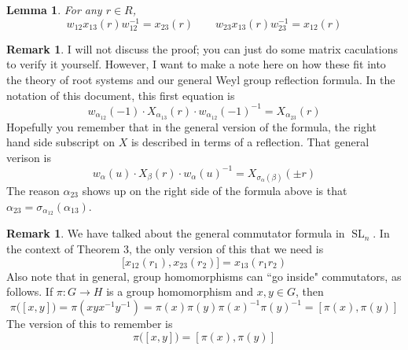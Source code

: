 \documentclass[12pt]{article}
\newtheorem{lemma}[theorem]{Lemma}
\theoremstyle{definition}
\newtheorem{remark}[theorem]{Remark}
\numberwithin{theorem}{subsection}
\newcommand{\sig}{\sigma}
\newcommand{\inv}{^{-1}}
\DeclareMathOperator{\SL}{SL}
\begin{document}
\begin{lemma}
For any $r \in R$, 
\[
	w_{12} x_{13}(r) w_{12} \inv = x_{23}(r) \qquad w_{23} x_{13}(r) w_{23} \inv = x_{12}(r)
\]
\end{lemma}

\begin{remark}
I will not discuss the proof; you can just do some matrix caculations to verify it yourself. However, I want to make a note here on how these fit into the theory of root systems and our general Weyl group reflection formula. In the notation of this document, this first equation is
\[
	w_{\alpha_{12}}(-1) \cdot X_{\alpha_{13}}(r) \cdot w_{\alpha_{12}}(-1) \inv = X_{\alpha_{23}}(r)
\]
Hopefully you remember that in the general version of the formula, the right hand side subscript on $X$ is described in terms of a reflection. That general verison is
\[
	w_\alpha(u) \cdot X_{\beta}(r) \cdot w_\alpha(u) \inv = X_{\sig_\alpha(\beta)} ( \pm r)
\]
The reason $\alpha_{23}$ shows up on the right side of the formula above is that $\alpha_{23} = \sig_{\alpha_{12}} (\alpha_{13})$.
\end{remark}

\begin{remark}
We have talked about the general commutator formula in $\SL_n$. In the context of Theorem 3, the only version of this that we need is
\[
	\Big[ x_{12}(r_1), x_{23}(r_2) \Big] = x_{13}(r_1 r_2)
\]
Also note that in general, group homomorphisms can ``go inside" commutators, as follows. If $\pi:G \to H$ is a group homomorphism and $x,y \in G$, then
\[
	\pi \big( [x,y] \big) = \pi(xyx \inv y \inv) = \pi(x) \pi(y) \pi(x) \inv \pi(y) \inv = [\pi(x), \pi(y)]
\]
The version of this to remember is
\[
	\pi \big( [x,y] \big)  = [\pi(x), \pi(y)]
\]
\end{remark}
\end{document}
